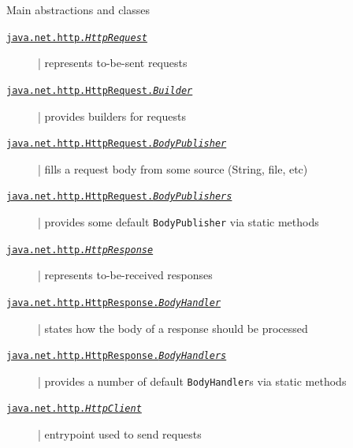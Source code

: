 \documentclass[presentation]{beamer}\mode<presentation>{\usetheme{AMSCesenaPurpleAndGold}}
\begin{document}
\begin{frame}[allowframebreaks]
    \begin{block}{Main abstractions and classes}
        \begin{description}
            \item[\href{https://docs.oracle.com/en/java/javase/15/docs/api/java.net.http/java/net/http/HttpRequest.html}{\texttt{java.net.http.\textit{HttpRequest}}}] | represents to-be-sent requests
            \item[\href{https://docs.oracle.com/en/java/javase/15/docs/api/java.net.http/java/net/http/HttpRequest.Builder.html}{\texttt{java.net.http.HttpRequest.\textit{Builder}}}] | provides builders for requests
            \item[\href{https://docs.oracle.com/en/java/javase/15/docs/api/java.net.http/java/net/http/HttpRequest.BodyPublisher.html}{\texttt{java.net.http.HttpRequest.\textit{BodyPublisher}}}] | fills a request body from some source (String, file, etc)
            \item[\href{https://docs.oracle.com/en/java/javase/15/docs/api/java.net.http/java/net/http/HttpRequest.BodyPublishers.html}{\texttt{java.net.http.HttpRequest.\textit{BodyPublishers}}}] | provides some default \texttt{BodyPublisher} via static methods
            \item[\href{https://docs.oracle.com/en/java/javase/15/docs/api/java.net.http/java/net/http/HttpResponse.html}{\texttt{java.net.http.\textit{HttpResponse}}}] | represents to-be-received responses
            \item[\href{https://docs.oracle.com/en/java/javase/15/docs/api/java.net.http/java/net/http/HttpResponse.BodyHandler.html}{\texttt{java.net.http.HttpResponse.\textit{BodyHandler}}}] | states how the body of a response should be processed
            \item[\href{https://docs.oracle.com/en/java/javase/15/docs/api/java.net.http/java/net/http/HttpResponse.BodyHandlers.html}{\texttt{java.net.http.HttpResponse.\textit{BodyHandlers}}}] | provides a number of default \texttt{BodyHandler}s via static methods
            \item[\href{https://docs.oracle.com/en/java/javase/15/docs/api/java.net.http/java/net/http/HttpClient.html}{\texttt{java.net.http.\textit{HttpClient}}}] | entrypoint used to send requests
        \end{description}
    \end{block}




\end{frame}
\end{document}
